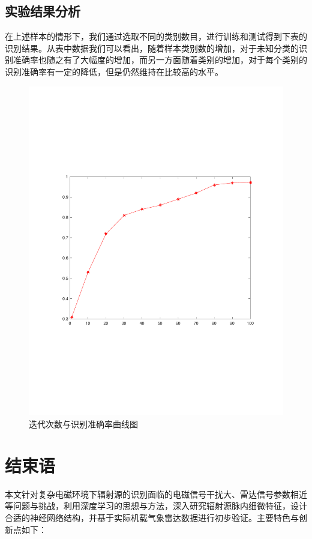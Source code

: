 \subsection{实验结果分析}

在上述样本的情形下，我们通过选取不同的类别数目，进行训练和测试得到下表的识别结果。从表中数据我们可以看出，随着样本类别数的增加，对于未知分类的识别准确率也随之有了大幅度的增加，而另一方面随着类别的增加，对于每个类别的识别准确率有一定的降低，但是仍然维持在比较高的水平。
\begin{figure}
	\centering
	\includegraphics{figures/diff_epoch.pdf}
	\caption{迭代次数与识别准确率曲线图}
\end{figure}





\section{结束语}

本文针对复杂电磁环境下辐射源的识别面临的电磁信号干扰大、雷达信号参数相近等问题与挑战，利用深度学习的思想与方法，深入研究辐射源脉内细微特征，设计合适的神经网络结构，并基于实际机载气象雷达数据进行初步验证。主要特色与创新点如下：



